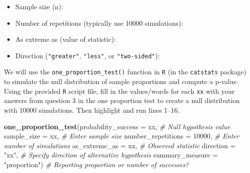 \documentclass[
]{report}
\newenvironment{Shaded}{\begin{snugshade}}{\end{snugshade}}
\newcommand{\AttributeTok}[1]{\textcolor[rgb]{0.13,0.29,0.53}{#1}}
\newcommand{\CommentTok}[1]{\textcolor[rgb]{0.56,0.35,0.01}{\textit{#1}}}
\newcommand{\DecValTok}[1]{\textcolor[rgb]{0.00,0.00,0.81}{#1}}
\newcommand{\FunctionTok}[1]{\textcolor[rgb]{0.13,0.29,0.53}{\textbf{#1}}}
\newcommand{\NormalTok}[1]{#1}
\newcommand{\StringTok}[1]{\textcolor[rgb]{0.31,0.60,0.02}{#1}}
\providecommand{\tightlist}{%
  \setlength{\itemsep}{0pt}\setlength{\parskip}{0pt}}
\begin{document}
\begin{itemize}
\tightlist
\item
  Sample size (n):
\end{itemize}

\vspace{.2in}

\begin{itemize}
\tightlist
\item
  Number of repetitions (typically use 10000 simulations):
\end{itemize}

\vspace{.2in}

\begin{itemize}
\tightlist
\item
  As extreme as (value of statistic):
\end{itemize}

\vspace{.2in}

\begin{itemize}
\tightlist
\item
  Direction (\texttt{"greater"}, \texttt{"less"}, or \texttt{"two-sided"}):
\end{itemize}

We will use the \texttt{one\_proportion\_test()} function in \texttt{R} (in the \texttt{catstats} package) to simulate the null distribution of sample proportions and compute a p-value. Using the provided \texttt{R} script file, fill in the values/words for each \texttt{xx} with your answers from question 3 in the one proportion test to create a null distribution with 10000 simulations. Then highlight and run lines 1--16.

\begin{Shaded}
\begin{Highlighting}[]
\FunctionTok{one\_proportion\_test}\NormalTok{(}\AttributeTok{probability\_success =}\NormalTok{ xx, }\CommentTok{\# Null hypothesis value}
          \AttributeTok{sample\_size =}\NormalTok{ xx, }\CommentTok{\# Enter sample size}
          \AttributeTok{number\_repetitions =} \DecValTok{10000}\NormalTok{, }\CommentTok{\# Enter number of simulations}
          \AttributeTok{as\_extreme\_as =}\NormalTok{ xx, }\CommentTok{\# Observed statistic}
          \AttributeTok{direction =} \StringTok{"xx"}\NormalTok{, }\CommentTok{\# Specify direction of alternative hypothesis}
          \AttributeTok{summary\_measure =} \StringTok{"proportion"}\NormalTok{) }\CommentTok{\# Reporting proportion or number of successes?}
\end{Highlighting}
\end{Shaded}
\end{document}
